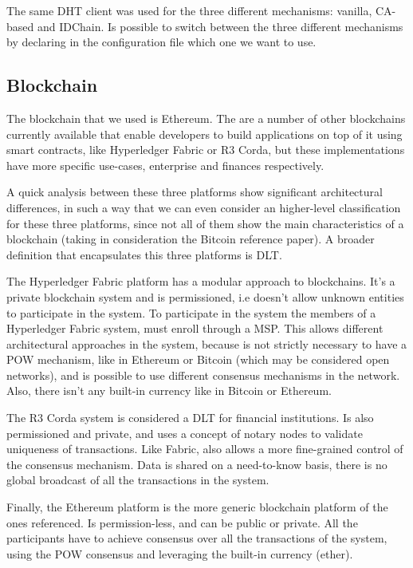 The same DHT client was used for the three different mechanisms: vanilla, CA-based and IDChain.
Is possible to switch between the three different mechanisms by declaring in the configuration file which one we want to use.

\subsection{Blockchain}

The blockchain that we used is Ethereum.
The are a number of other blockchains currently available that enable developers to build applications on top of it using smart contracts, like Hyperledger Fabric\cite{cachin2016architecture} or R3 Corda\cite{mikehearn2016}, but these implementations have more specific use-cases, enterprise and finances respectively.

A quick analysis between these three platforms show significant architectural differences, in such a way that we can even consider an higher-level classification for these  three platforms, since not all of them show the main characteristics of a blockchain (taking in consideration the Bitcoin reference paper).
A broader definition that encapsulates this three platforms is \ac{DLT}.

The Hyperledger Fabric platform has a modular approach to blockchains. It's a private blockchain system  and is permissioned, i.e doesn't allow unknown entities to participate in the system.
To participate in the system the members of a Hyperledger Fabric system, must enroll through a \ac{MSP}.
This allows different architectural approaches in the system, because is not strictly necessary to have a \ac{POW} mechanism, like in Ethereum or Bitcoin (which may be considered open networks), and is possible to use different consensus mechanisms in the network.
Also, there isn't any built-in currency like in Bitcoin or Ethereum.

The R3 Corda system is considered a \ac{DLT} for financial institutions.
Is also permissioned and private, and uses a concept of notary nodes to validate uniqueness of transactions. Like Fabric, also allows a more fine-grained control of the consensus mechanism.
Data is shared on a need-to-know basis, there is no global broadcast of all the transactions in the system.

Finally, the Ethereum platform is the more generic blockchain platform of the ones referenced.
Is permission-less, and can be public or private.
All the participants have to achieve consensus over all the transactions of the system, using the \ac{POW} consensus and leveraging the built-in currency (ether).

